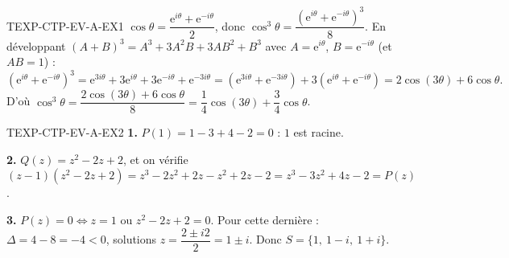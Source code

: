 %
\begin{corrige}{TEXP-CTP-EV-A-EX1}
$\cos\theta = \dfrac{\mathrm{e}^{i\theta}+\mathrm{e}^{-i\theta}}{2}$, donc $\cos^3\theta = \dfrac{(\mathrm{e}^{i\theta}+\mathrm{e}^{-i\theta})^3}{8}$. En développant $(A+B)^3=A^3+3A^2B+3AB^2+B^3$ avec $A=\mathrm{e}^{i\theta}$, $B=\mathrm{e}^{-i\theta}$ (et $AB=1$) :
\[
  (\mathrm{e}^{i\theta}+\mathrm{e}^{-i\theta})^3 = \mathrm{e}^{3i\theta}+3\mathrm{e}^{i\theta}+3\mathrm{e}^{-i\theta}+\mathrm{e}^{-3i\theta} = (\mathrm{e}^{3i\theta}+\mathrm{e}^{-3i\theta}) + 3(\mathrm{e}^{i\theta}+\mathrm{e}^{-i\theta}) = 2\cos(3\theta)+6\cos\theta.
\]
D'où $\cos^3\theta = \dfrac{2\cos(3\theta)+6\cos\theta}{8} = \dfrac{1}{4}\cos(3\theta)+\dfrac{3}{4}\cos\theta$.
\end{corrige}

\begin{corrige}{TEXP-CTP-EV-A-EX2}
\textbf{1.} $P(1)=1-3+4-2=0$ : $1$ est racine.

\textbf{2.} $Q(z)=z^2-2z+2$, et on vérifie $(z-1)(z^2-2z+2) = z^3-2z^2+2z-z^2+2z-2 = z^3-3z^2+4z-2=P(z)$.

\textbf{3.} $P(z)=0 \iff z=1$ ou $z^2-2z+2=0$. Pour cette dernière : $\Delta=4-8=-4<0$, solutions $z=\dfrac{2\pm i2}{2}=1\pm i$. Donc $S=\{1,\ 1-i,\ 1+i\}$.
\end{corrige}

